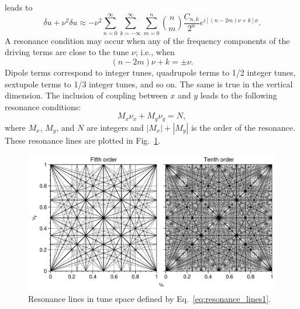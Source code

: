 %
leads to
%
\begin{equation}\label{eq:pert2}
    \ddot{\delta u} + \nu^2 \delta u \approx -\nu^2 \sum_{n=0}^{\infty}\sum_{k=-\infty}^{\infty} \sum_{m=0}^{n} {n \choose m} \frac{C_{n,k}}{2^n} e^{i\left[(n - 2m)\nu + k\right]\phi}.
\end{equation}
%
A resonance condition may occur when any of the frequency components of the driving terms are close to the tune $\nu$; i.e., when
%
\begin{equation}
    (n - 2m)\nu + k = \pm \nu.
\end{equation}
%
Dipole terms correspond to integer tunes, quadrupole terms to 1/2 integer tunes, sextupole terms to 1/3 integer tunes, and so on. The same is true in the vertical dimension. The inclusion of coupling between $x$ and $y$ leads to the following resonance conditions:
%
\begin{equation}\label{eq:resonance_lines1}
    M_x \nu_x + M_y \nu_y = N,
\end{equation}
%
where $M_x$, $M_y$, and $N$ are integers and $|M_x| + |M_y|$ is the order of the resonance. These resonance lines are plotted in Fig.~\ref{fig:resonance_lines}.
%
\begin{figure}[!p]
    \centering
    \includegraphics[width=\textwidth]{Images/chapter1/resonance_lines.png}
    \caption{Resonance lines in tune space defined by Eq.~\eqref{eq:resonance_lines1}.}
    \label{fig:resonance_lines}
\end{figure}
%
